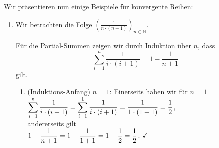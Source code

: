 \noindent
Wir pr\"asentieren nun einige Beispiele f\"ur konvergente Reihen:
\begin{enumerate}
\item Wir betrachten die Folge $\left(\frac{1}{n\cdot (n+1)}\right)_{n\in\mathbb{N}}$.

      F\"ur die Partial-Summen zeigen wir durch Induktion \"uber $n$, dass 
      \begin{equation}
        \label{eq:seq0}        
      \sum\limits_{i=1}^n \frac{1}{i\cdot (i+1)} = 1 - \frac{1}{n+1}
      \end{equation}
      gilt.
      \begin{enumerate}
      \item (Induktions-Anfang) $n=1$: Einerseits haben wir f\"ur $n=1$
           \\[0.2cm]
           \hspace*{1.3cm}      
           $\displaystyle\sum\limits_{i=1}^n \frac{1}{i\cdot (i+1)} = \sum\limits_{i=1}^1 \frac{1}{i\cdot (i+1)}
            = \frac{1}{1\cdot (1+1)} = \frac{1}{2}$,
           \\[0.2cm]
           andererseits gilt
           \\[0.2cm]
           \hspace*{1.3cm}      
           $\displaystyle 1 - \frac{1}{n+1} = 1 - \frac{1}{1+1} = 1 - \frac{1}{2} = \frac{1}{2}$. $\checkmark$
           \pagebreak


\end{enumerate}
\end{enumerate}
